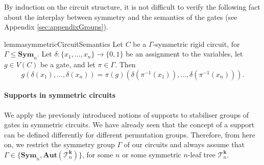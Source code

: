 \documentclass[11pt]{article}
\newcommand{\Aut}{\mathbf{Aut}}
\newcommand{\Sym}{\mathbf{Sym}}
\newcommand{\Tt}{{\mathcal T}}
\theoremstyle{definition}
\theoremstyle{plain}
\theoremstyle{remark}
\theoremstyle{remark}
\begin{document}
By induction on the circuit structure, it is not difficult to verify the following fact about the interplay between symmetry and the semantics of the gates (see Appendix \ref{sec:appendixGroups}).
\begin{restatable}{lemma}{symmetricCircuitSemantics}
	\label{lem:symmetricCircuitSemantics}
	Let $C$ be a $\Gamma$-symmetric rigid circuit, for $\Gamma \leq \Sym_n$. Let $\delta \colon \{x_1, \dots, x_n\} \to \{0,1\}$ be an assignment to the variables, let $g \in V(C)$ be a gate, and let $\pi \in \Gamma$. Then 
	\[
	g(\delta(x_1), \dots, \delta(x_n)) = \pi(g)(\delta(\pi^{-1}(x_1)), \dots, \delta(\pi^{-1}(x_n))).
	\]
\end{restatable}	


\paragraph*{Supports in symmetric circuits}
We apply the previously introduced notions of supports to stabiliser groups of gates in symmetric circuits. 
We have already seen that the concept of a support can be defined differently for different permutation groups. Therefore, from here on, we restrict the symmetry group $\Gamma$ of our circuits and always assume that $\Gamma \in \{\Sym_n, \Aut(\Tt_n^{\boldsymbol{k}}) \}$, for some $n$ or some symmetric $n$-leaf tree $\Tt_n^{\boldsymbol{k}}$.
\end{document}
